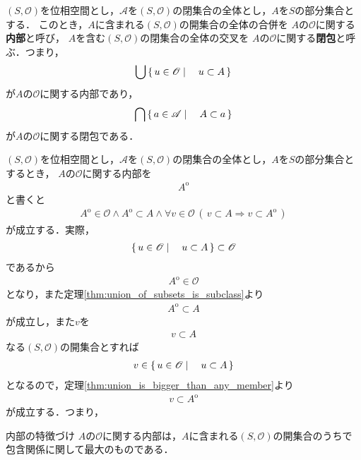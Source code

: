 	\begin{screen}
		\begin{dfn}[内部・閉包]
			$(S,\mathscr{O})$を位相空間とし，$\mathscr{A}$を$(S,\mathscr{O})$の閉集合の全体とし，$A$を$S$の部分集合とする．
			このとき，$A$に含まれる$(S,\mathscr{O})$の開集合の全体の合併を
			$A$の$\mathscr{O}$に関する{\bf 内部}と呼び，
			$A$を含む$(S,\mathscr{O})$の閉集合の全体の交叉を
			$A$の$\mathscr{O}$に関する{\bf 閉包}と呼ぶ．つまり，
			\begin{align}
				\bigcup \left\{\, u \in \mathscr{O} \mid \quad u \subset A\, \right\}
			\end{align}
			が$A$の$\mathscr{O}$に関する内部であり，
			\begin{align}
				\bigcap \left\{\, a \in \mathscr{A} \mid \quad A \subset a\, \right\}
			\end{align}
			が$A$の$\mathscr{O}$に関する閉包である．
		\end{dfn}
	\end{screen}
	
	$(S,\mathscr{O})$を位相空間とし，$\mathscr{A}$を$(S,\mathscr{O})$の閉集合の全体とし，$A$を$S$の部分集合とするとき，
	$A$の$\mathscr{O}$に関する内部を
	\begin{align}
		A^{\mathrm{o}}
	\end{align}
	と書くと
	\begin{align}
		A^{\mathrm{o}} \in \mathscr{O} \wedge A^{\mathrm{o}} \subset A \wedge 
		\forall v \in \mathscr{O}\, \left(\, v \subset A \Longrightarrow v \subset A^{\mathrm{o}}\, \right)
		\label{fom:interior_is_the_largest_open_subset}
	\end{align}
	が成立する．実際，
	\begin{align}
		\left\{\, u \in \mathscr{O} \mid \quad u \subset A\, \right\} \subset \mathscr{O}
	\end{align}
	であるから
	\begin{align}
		A^{\mathrm{o}} \in \mathscr{O}
	\end{align}
	となり，また定理\ref{thm:union_of_subsets_is_subclass}より
	\begin{align}
		A^{\mathrm{o}} \subset A
	\end{align}
	が成立し，また$v$を
	\begin{align}
		v \subset A
	\end{align}
	なる$(S,\mathscr{O})$の開集合とすれば
	\begin{align}
		v \in \left\{\, u \in \mathscr{O} \mid \quad u \subset A\, \right\}
	\end{align}
	となるので，定理\ref{thm:union_is_bigger_than_any_member}より
	\begin{align}
		v \subset A^{\mathrm{o}}
	\end{align}
	が成立する．つまり，
	\begin{itembox}[l]{内部の特徴づけ}
		$A$の$\mathscr{O}$に関する内部は，$A$に含まれる$(S,\mathscr{O})$の開集合のうちで包含関係に関して最大のものである．
	\end{itembox}
	
